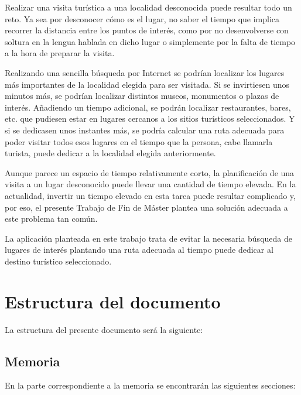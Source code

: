 
Realizar una visita turística a una localidad desconocida puede resultar todo un reto. Ya sea por desconocer cómo es el lugar, no saber el tiempo que implica recorrer la distancia entre los puntos de interés, como por no desenvolverse con soltura en la lengua hablada en dicho lugar o simplemente por la falta de tiempo a la hora de preparar la visita.

Realizando una sencilla búsqueda por Internet se podrían localizar los lugares más importantes de la localidad elegida para ser visitada. Si se invirtiesen unos minutos más, se podrían localizar distintos museos, monumentos o plazas de interés. Añadiendo un tiempo adicional, se podrán localizar restaurantes, bares, etc. que pudiesen estar en lugares cercanos a los sitios turísticos seleccionados. Y si se dedicasen unos instantes más, se podría calcular una ruta adecuada para poder visitar todos esos lugares en el tiempo que la persona, cabe llamarla turista, puede dedicar a la localidad elegida anteriormente.

Aunque parece un espacio de tiempo relativamente corto, la planificación de una visita a un lugar desconocido puede llevar una cantidad de tiempo elevada. En la actualidad, invertir un tiempo elevado en esta tarea puede resultar complicado y, por eso, el presente Trabajo de Fin de Máster plantea una solución adecuada a este problema tan común.

La aplicación planteada en este trabajo trata de evitar la necesaria búsqueda de lugares de interés plantando una ruta adecuada al tiempo puede dedicar al destino turístico seleccionado.



\section{Estructura del documento}

La estructura del presente documento será la siguiente:

\subsection{Memoria}

En la parte correspondiente a la memoria se encontrarán las siguientes secciones:

